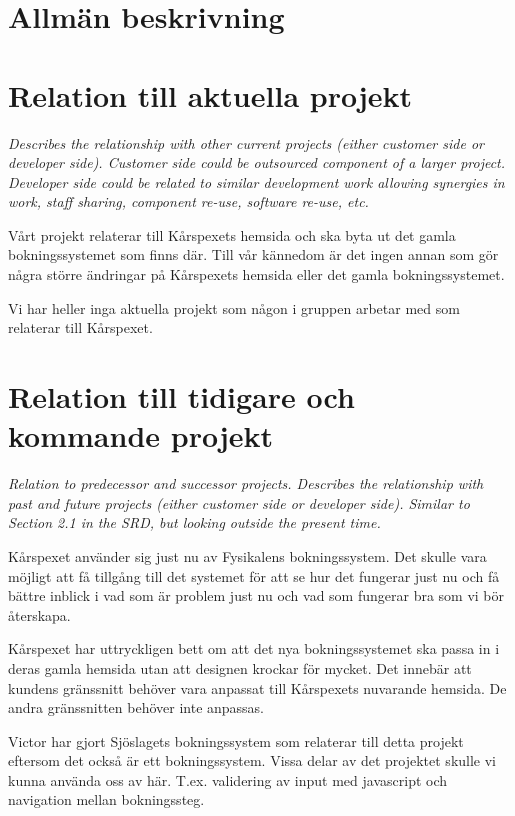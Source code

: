 \documentclass[a4paper, twoside, 11pt, titlepage]{article}
\begin{document}
\clearpage
\section{Allmän beskrivning}



\clearpage
\section{Relation till aktuella projekt}


\emph{Describes the relationship with other current projects (either customer side or developer side). Customer side could be outsourced component of a larger project. Developer side could be related to similar development work allowing synergies in work, staff sharing, component re-use, software re-use, etc.}

Vårt projekt relaterar till Kårspexets hemsida och ska byta ut det gamla bokningssystemet som finns där. Till vår kännedom är det ingen annan som gör några större ändringar på Kårspexets hemsida eller det gamla bokningssystemet.

Vi har heller inga aktuella projekt som någon i gruppen arbetar med som relaterar till Kårspexet.

\clearpage
\section{Relation till tidigare och kommande projekt}


\emph{Relation to predecessor and successor projects. Describes the relationship with past and future projects (either customer side or developer side). Similar to Section 2.1 in the SRD, but looking outside the present time.}

Kårspexet använder sig just nu av Fysikalens bokningssystem. Det skulle vara möjligt att få tillgång till det systemet för att se hur det fungerar just nu och få bättre inblick i vad som är problem just nu och vad som fungerar bra som vi bör återskapa.

Kårspexet har uttryckligen bett om att det nya bokningssystemet ska passa in i deras gamla hemsida utan att designen krockar för mycket. Det innebär att kundens gränssnitt behöver vara anpassat till Kårspexets nuvarande hemsida. De andra gränssnitten behöver inte anpassas.

Victor har gjort Sjöslagets bokningssystem som relaterar till detta projekt eftersom det också är ett bokningssystem. Vissa delar av det projektet skulle vi kunna använda oss av här. T.ex. validering av input med javascript och navigation mellan bokningssteg.
\end{document}
